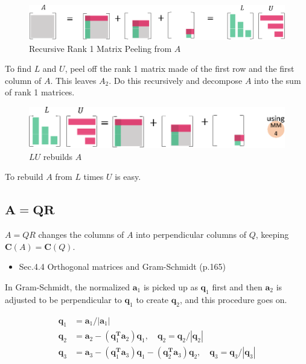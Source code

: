 \documentclass[letterpaper]{article}
\begin{document}
\begin{figure}[H]
  \includegraphics[keepaspectratio, width=\linewidth]{LU1.eps}
\caption{Recursive Rank 1 Matrix Peeling from $A$}
\end{figure}

To find $L$ and $U$, peel off the rank 1 matrix made of
the first row and the first column of $A$.
This leaves $A_2$. Do this recursively and decompose $A$ into the sum of rank 1 matrices.


\begin{figure}[H]
  \includegraphics[keepaspectratio, width=\linewidth]{LU2.eps}
\caption{$LU$ rebuilds $A$}
\end{figure}

To rebuild $A$ from $L$ times $U$ is easy.

\clearpage

\subsection{$\boldsymbol{A=QR}$}

$A=QR$ changes the columns of $A$ into perpendicular columns of $Q$, keeping $\bm{C}(A) = \bm{C}(Q)$.

\begin{itemize}
  \item Sec.4.4 Orthogonal matrices and Gram-Schmidt (p.165)
\end{itemize}

In Gram-Schmidt, the normalized $\bm{a}_1$ is picked up as $\bm{q}_1$ first and then
$\bm{a}_2$ is adjusted to be perpendicular to $\bm{q}_1$ to create $\bm{q}_2$, and this
procedure goes on.

\begin{align*}
  \bm{q}_1 &= \bm{a}_1/|\bm{a}_1| \\
  \bm{q}_2 &= \bm{a}_2 - (\bm{q}_1^\mathbf{T} \bm{a}_2)\bm{q}_1 , \quad \bm{q}_2 = \bm{q}_2/|\bm{q}_2| \\
  \bm{q}_3 &= \bm{a}_3 - (\bm{q}_1^\mathbf{T} \bm{a}_3)\bm{q}_1 - (\bm{q}_2^\mathbf{T} \bm{a}_3)\bm{q}_2, \quad \bm{q}_3 = \bm{q}_3/|\bm{q}_3|
\end{align*}
\end{document}
